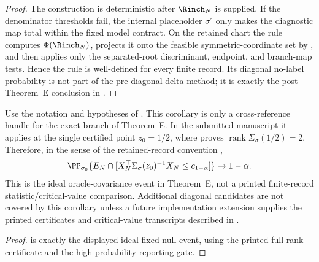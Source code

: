\begin{proof}
The construction is deterministic after \(\Rinch_N\) is supplied.  If the
denominator thresholds fail, the internal placeholder \(\sigma^\circ\) only
makes the diagnostic map total within the fixed model contract.  On the
retained chart the rule computes
\(\Phi(\Rinch_N)\), projects it onto the feasible symmetric-coordinate set
by , and then applies only the
separated-root discriminant, endpoint, and branch-map tests.  Hence the rule is
well-defined for every finite record.  Its diagonal no-label probability is not
part of the pre-diagonal delta method; it is exactly the post-Theorem~E
conclusion in .
\end{proof}

\begin{corollary}\label{cor:diagonal-projected-gaussian-exact-branch-main}
Use the notation and hypotheses of
.  This corollary is only a
cross-reference handle for the exact branch of Theorem~E.  In the submitted
manuscript it applies at the single certified point \(z_0=1/2\), where
 proves
\(\operatorname{rank}\Sigma_\sigma(1/2)=2\).  Therefore, in the sense of the
retained-record convention ,
\[
\PP_{\sigma_0}\{E_N\cap[
X_N^\top\Sigma_\sigma(z_0)^{-1}X_N\le c_{1-\alpha}]\}\to1-\alpha .
\]
This is the ideal oracle-covariance event in Theorem~E, not a printed
finite-record statistic/critical-value comparison.
Additional diagonal candidates are not covered by this corollary unless a
future implementation extension supplies the printed certificates and
critical-value transcripts described in
.
\end{corollary}

\begin{proof}
 is exactly the displayed
ideal fixed-null event, using the printed full-rank certificate and the
high-probability reporting gate.
\end{proof}


